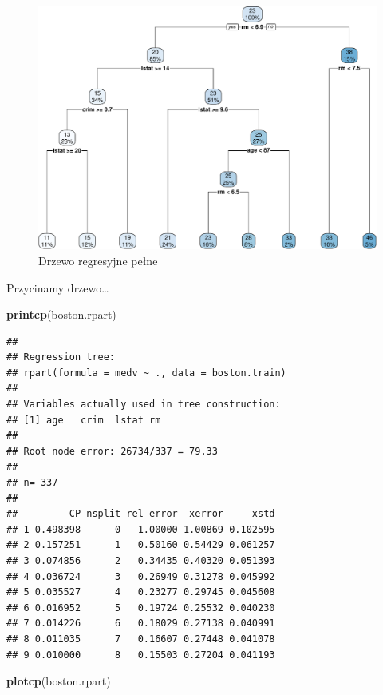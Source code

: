 \documentclass[
]{book}
\newenvironment{Shaded}{\begin{snugshade}}{\end{snugshade}}
\newcommand{\KeywordTok}[1]{\textcolor[rgb]{0.13,0.29,0.53}{\textbf{#1}}}
\newcommand{\NormalTok}[1]{#1}
\theoremstyle{plain}
\theoremstyle{definition}
\theoremstyle{definition}
\theoremstyle{definition}
\theoremstyle{definition}
\theoremstyle{remark}
\begin{document}
\begin{figure}
\centering
\includegraphics{EksploracjaDanych_files/figure-latex/unnamed-chunk-32-1.pdf}
\caption{\label{fig:unnamed-chunk-32}Drzewo regresyjne pełne}
\end{figure}

Przycinamy drzewo\ldots{}

\begin{Shaded}
\begin{Highlighting}[]
\KeywordTok{printcp}\NormalTok{(boston.rpart)}
\end{Highlighting}
\end{Shaded}

\begin{verbatim}
## 
## Regression tree:
## rpart(formula = medv ~ ., data = boston.train)
## 
## Variables actually used in tree construction:
## [1] age   crim  lstat rm   
## 
## Root node error: 26734/337 = 79.33
## 
## n= 337 
## 
##         CP nsplit rel error  xerror     xstd
## 1 0.498398      0   1.00000 1.00869 0.102595
## 2 0.157251      1   0.50160 0.54429 0.061257
## 3 0.074856      2   0.34435 0.40320 0.051393
## 4 0.036724      3   0.26949 0.31278 0.045992
## 5 0.035527      4   0.23277 0.29745 0.045608
## 6 0.016952      5   0.19724 0.25532 0.040230
## 7 0.014226      6   0.18029 0.27138 0.040991
## 8 0.011035      7   0.16607 0.27448 0.041078
## 9 0.010000      8   0.15503 0.27204 0.041193
\end{verbatim}

\begin{Shaded}
\begin{Highlighting}[]
\KeywordTok{plotcp}\NormalTok{(boston.rpart)}
\end{Highlighting}
\end{Shaded}
\end{document}
